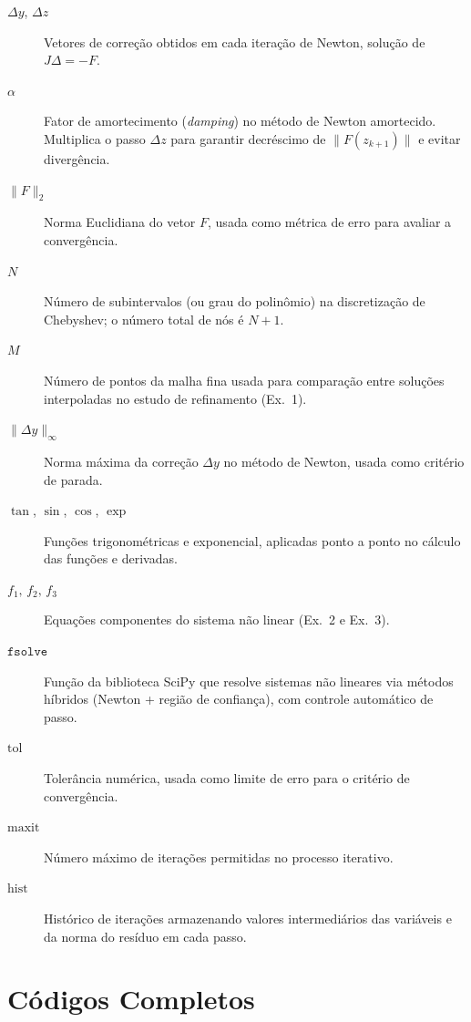 \documentclass[12pt,a4paper]{article}
\begin{document}
\begin{description}
    \item[$\Delta y$, $\Delta z$] Vetores de correção obtidos em cada iteração de Newton, solução de $J \Delta = -F$.

    \item[$\alpha$] Fator de amortecimento (\emph{damping}) no método de Newton amortecido.
    Multiplica o passo $\Delta z$ para garantir decréscimo de $\|F(z_{k+1})\|$ e evitar divergência.

    \item[$\|F\|_2$] Norma Euclidiana do vetor $F$, usada como métrica de erro para avaliar a convergência.

    \item[$N$] Número de subintervalos (ou grau do polinômio) na discretização de Chebyshev; o número total de nós é $N{+}1$.

    \item[$M$] Número de pontos da malha fina usada para comparação entre soluções interpoladas no estudo de refinamento (Ex.~1).

    \item[$\|\Delta y\|_{\infty}$] Norma máxima da correção $\Delta y$ no método de Newton, usada como critério de parada.

    \item[$\tan$, $\sin$, $\cos$, $\exp$] Funções trigonométricas e exponencial, aplicadas ponto a ponto no cálculo das funções e derivadas.

    \item[$f_1,\,f_2,\,f_3$] Equações componentes do sistema não linear (Ex.~2 e Ex.~3).

    \item[$\texttt{fsolve}$] Função da biblioteca SciPy que resolve sistemas não lineares
    via métodos híbridos (Newton + região de confiança), com controle automático de passo.

    \item[$\text{tol}$] Tolerância numérica, usada como limite de erro para o critério de convergência.

    \item[$\text{maxit}$] Número máximo de iterações permitidas no processo iterativo.

    \item[$\text{hist}$] Histórico de iterações armazenando valores intermediários das variáveis e da norma do resíduo em cada passo.
\end{description}


\appendix
\section{Códigos Completos}
\end{document}
